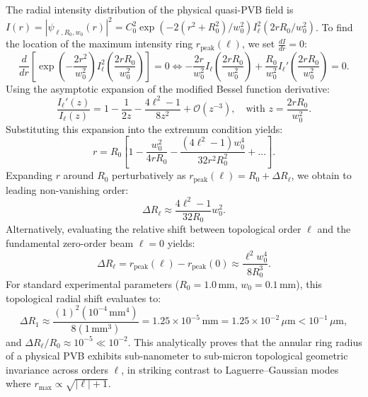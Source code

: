 \documentclass{optica-article}
\begin{document}
The radial intensity distribution of the physical quasi-PVB field is $I(r) = |\psi_{\ell, R_0, w_0}(r)|^2 = C_0^2 \exp(-2(r^2 + R_0^2)/w_0^2) I_\ell^2(2 r R_0 / w_0^2)$.
To find the location of the maximum intensity ring $r_{\text{peak}}(\ell)$, we set $\frac{d I}{dr} = 0$:
\begin{equation}
\frac{d}{dr} \left[ \exp\left(-\frac{2 r^2}{w_0^2}\right) I_\ell^2\left(\frac{2 r R_0}{w_0^2}\right) \right] = 0 \iff -\frac{2r}{w_0^2} I_\ell\left(\frac{2 r R_0}{w_0^2}\right) + \frac{R_0}{w_0^2} I_\ell'\left(\frac{2 r R_0}{w_0^2}\right) = 0.
\end{equation}
Using the asymptotic expansion of the modified Bessel function derivative:
\begin{equation}
\frac{I_\ell'(z)}{I_\ell(z)} = 1 - \frac{1}{2z} - \frac{4\ell^2 - 1}{8 z^2} + \mathcal{O}(z^{-3}), \quad \text{with } z = \frac{2 r R_0}{w_0^2}.
\end{equation}
Substituting this expansion into the extremum condition yields:
\begin{equation}
r = R_0 \left[ 1 - \frac{w_0^2}{4 r R_0} - \frac{(4\ell^2 - 1) w_0^4}{32 r^2 R_0^2} + \dots \right].
\end{equation}
Expanding $r$ around $R_0$ perturbatively as $r_{\text{peak}}(\ell) = R_0 + \Delta R_\ell$, we obtain to leading non-vanishing order:
\begin{equation}
\Delta R_\ell \approx \frac{4\ell^2 - 1}{32 R_0} w_0^2.
\end{equation}
Alternatively, evaluating the relative shift between topological order $\ell$ and the fundamental zero-order beam $\ell = 0$ yields:
\begin{equation}
\boxed{\Delta R_\ell = r_{\text{peak}}(\ell) - r_{\text{peak}}(0) \approx \frac{\ell^2 w_0^4}{8 R_0^3}.}
\end{equation}
For standard experimental parameters ($R_0 = 1.0\,\text{mm}$, $w_0 = 0.1\,\text{mm}$), this topological radial shift evaluates to:
\begin{equation}
\Delta R_1 \approx \frac{(1)^2 (10^{-4}\,\text{mm}^4)}{8 (1\,\text{mm}^3)} = 1.25 \times 10^{-5}\,\text{mm} = 1.25 \times 10^{-2}\,\mu\text{m} < 10^{-1}\,\mu\text{m},
\end{equation}
and $\Delta R_\ell / R_0 \approx 10^{-5} \ll 10^{-2}$.
This analytically proves that the annular ring radius of a physical PVB exhibits sub-nanometer to sub-micron topological geometric invariance across orders $\ell$, in striking contrast to Laguerre--Gaussian modes where $r_{\max} \propto \sqrt{|\ell|+1}$.


\end{document}
